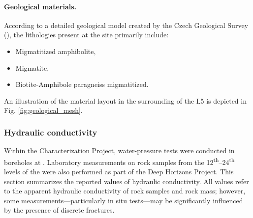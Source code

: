 \paragraph{Geological materials.}

According to a detailed geological model created by the Czech Geological Survey
(\cite{Bukovska2025final}), the lithologies present at the site primarily
include:
\begin{itemize}%
    \item Migmatitized amphibolite,
    \item Migmatite,
    \item Biotite-Amphibole paragneiss migmatitized.
\end{itemize}
An illustration of the material layout in the surrounding of the \gls{L5} is
depicted in Fig. \ref{fig:geological_mesh}.



\subsubsection{Hydraulic conductivity}
\label{sec:hydro_cond}
Within the Characterization Project, water-pressure tests were conducted in
boreholes at \URFBII. Laboratory measurements on rock samples from the
12\textsuperscript{th}--24\textsuperscript{th} levels of the \Rozna were also
performed as part of the Deep Horizons Project. This section summarizes the
reported values of hydraulic conductivity. All values refer to the apparent
hydraulic conductivity of rock samples and rock mass; however, some
measurements---particularly in situ tests---may be significantly influenced by
the presence of discrete fractures.

